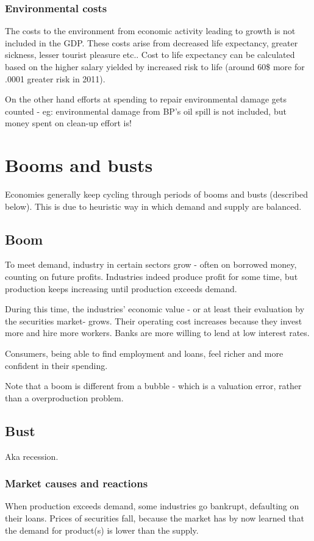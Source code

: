 \documentclass[oneside, article]{memoir}
\begin{document}
\subsubsection{Environmental costs}
The costs to the environment from economic activity leading to growth is not included in the GDP. These costs arise from decreased life expectancy, greater sickness, lesser tourist pleasure etc.. Cost to life expectancy can be calculated based on the higher salary yielded by increased risk to life (around 60\$ more for .0001 greater risk in 2011).

On the other hand efforts at spending to repair environmental damage gets counted - eg: environmental damage from BP's oil spill is not included, but money spent on clean-up effort is!

\section{Booms and busts}
Economies generally keep cycling through periods of booms and busts (described below). This is due to heuristic way in which demand and supply are balanced.

\subsection{Boom}
To meet demand, industry in certain sectors grow - often on borrowed money, counting on future profits. Industries indeed produce profit for some time, but production keeps increasing until production exceeds demand.

During this time, the industries' economic value - or at least their evaluation by the securities market- grows. Their operating cost increases because they invest more and hire more workers. Banks are more willing to lend at low interest rates.

Consumers, being able to find employment and loans, feel richer and more confident in their spending.

Note that a boom is different from a bubble - which is a valuation error, rather than a overproduction problem.

\subsection{Bust}
Aka recession.

\subsubsection{Market causes and reactions}
When production exceeds demand, some industries go bankrupt, defaulting on their loans. Prices of securities fall, because the market has by now learned that the demand for product(s) is lower than the supply.
\end{document}
